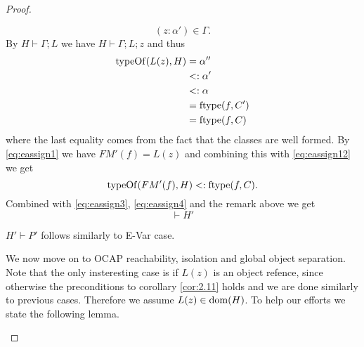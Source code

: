 \begin{proof}
\begin{description}
\begin{description}
\begin{description}
\begin{equation}
                (z: \alpha') \in \Gamma.
              \end{equation}
              By $H \vdash \Gamma; L$ we have $H \vdash \Gamma; L; z$ and thus
              \begin{equation} \label{eq:eassign12}
                \begin{aligned}
                  \mbox{$\mathrm{typeOf}$}(L(z), H) &= \alpha'' \\ 
                                   &<: \alpha' \\ 
                                   &<: \alpha \\ 
                                   &= \mbox{$\mathrm{ftype}$}(f, C') \\ 
                                   &= \mbox{$\mathrm{ftype}$}(f, C)
                \end{aligned}
              \end{equation}
              where the last equality comes from the fact that the classes are
              well formed. By \eqref{eq:eassign1} we have $FM'(f) = L(z)$ and
              combining this with \eqref{eq:eassign12} we get
              \begin{equation} \label{eq:eassign13}
                \mbox{$\mathrm{typeOf}$}(FM'(f), H) <: \mbox{$\mathrm{ftype}$}(f, C).
              \end{equation}
              Combined with \eqref{eq:eassign3}, \eqref{eq:eassign4} and the
              remark above we get
              \begin{equation*} 
                \vdash H'
              \end{equation*}

              $H' \vdash P'$ follows similarly to {\sc E-Var} case.

              We now move on to OCAP reachability, isolation and global object
              separation.  Note that the only insteresting case is if $L(z)$ is
              an object refence, since otherwise the preconditions to corollary
              \ref{cor:2.11} holds and we are done similarly to previous cases.
              Therefore we assume $L(z) \in \mbox{$\mathrm{dom}$}(H)$.  To help our efforts we
              state the following lemma.


\end{description}
\end{description}
\end{description}
\end{proof}
